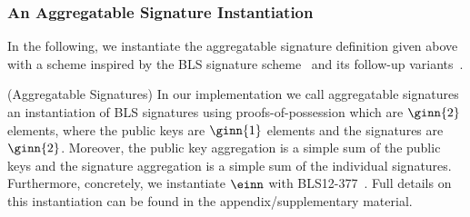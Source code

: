 \subsubsection{An Aggregatable Signature Instantiation}
\label{sec:bls}
\noindent In the following, we instantiate the aggregatable signature definition given above with a scheme inspired by the BLS signature
scheme~\cite{BLS_signatures} and its follow-up variants~\cite{proofs_of_posession,boneh_compact_multisig}.
\vspace{-0.1in}
\begin{construction}(Aggregatable Signatures) 
\label{insta:bls}
In our implementation we call aggregatable signatures an instantiation of BLS signatures using proofs-of-possession which are $\ginn{2}$ elements, 
where the public keys are $\ginn{1}$ elements and the signatures are $\ginn{2}$. Moreover, the public key aggregation is a simple sum of the 
public keys and the signature aggregation is a simple sum of the individual signatures. Furthermore, concretely, we instantiate $\einn$ with BLS12-377~\cite{zexe}.
Full details on this instantiation can be found in the appendix/supplementary material. 
 
\begin{comment}
\begin{itemize}
\item $(\ginn{1}, \sginn{1}, \ginn{2}, \sginn{2}, \gtinn, \epinn, \Hinn, \HPoP)$ from $\mathit{pp}$ where 
$\mathit{pp} \leftarrow  \mathit{AS.Setup}(\mathit{aux_{\mathit{AS}}})$, 
where $\ginn{1}$, $\sginn{1}$, $\ginn{2}$, $\sginn{2}$, $\gtinn$, $\epinn$ were defined in section~\ref{sec:pairings} and 
$\Hinn: \{0,1\}^* \rightarrow \ginn{2}$ and $\HPoP: \{0,1\}^* \rightarrow \ginn{2}$ are two hash functions. 
The auxiliary parameter $\mathit{aux_{\mathit{AS}}}$ is such that there exists $N \in \mathbb{N}$, 
$N$ is the first component of the vector $\mathit{aux_{\mathit{AS}}}$ and there exists a subgroup of size at least $N$ in the multiplicative group of $\mathbb{F}$, where $\mathbb{F}$ 
is the base field of $\einn$, but also the size of the subgroup $\in O(N)$.

\item $(\mathit{pk},\mathit{sk}, \pi_{\PoP}) \leftarrow \mathit{AS.GenerateKeypair}(\mathit{pp})$, where $\mathit{sk} \xleftarrow{\$} \mathbb{Z}_{r}^{*}$  
and $\mathit{pk} = \mathit{sk} \cdot \sginn{1} \in \ginn{1}$ and $\pi_{\PoP} \leftarrow {\mathit{sk}} \cdot \HPoP(\mathit{pk})$ 
and $r$ was defined in section~\ref{sec:pairings} as the characteristic of the scalar field of $\einn$.


\end{comment}
\end{construction}
